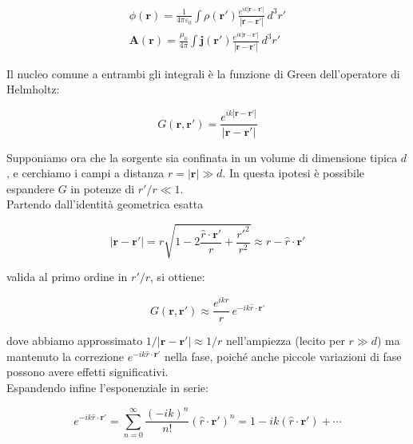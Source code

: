 \begin{tcolorbox}[colback=yellow!10!white, colframe=orange!70!black, 
boxrule=0.8pt]
\begin{align}
    \phi(\mathbf{r}) = \frac{1}{4\pi\varepsilon_0} \int 
    \rho(\mathbf{r'}) \frac{e^{ik|\mathbf{r}-\mathbf{r'}|}}
    {|\mathbf{r}-\mathbf{r'}|} \, d^3r' \\[6pt]
    \mathbf{A}(\mathbf{r}) = \frac{\mu_0}{4\pi} \int 
    \mathbf{j}(\mathbf{r'}) \frac{e^{ik|\mathbf{r}-\mathbf{r'}|}}
    {|\mathbf{r}-\mathbf{r'}|} \, d^3r'
\end{align}
\end{tcolorbox}

Il nucleo comune a entrambi gli integrali è la funzione di Green dell'operatore di Helmholtz:

\begin{equation}
    G(\mathbf{r}, \mathbf{r'}) = \frac{e^{ik|\mathbf{r}-\mathbf{r'}|}}
    {|\mathbf{r}-\mathbf{r'}|}
\end{equation}

Supponiamo ora che la sorgente sia confinata in un volume di dimensione tipica $d$, e cerchiamo i campi a distanza $r = |\mathbf{r}| \gg d$. 
In questa ipotesi è possibile espandere $G$ in potenze di $r'/r \ll 1$.\\

Partendo dall'identità geometrica esatta

\begin{equation}
    |\mathbf{r} - \mathbf{r'}| = r\sqrt{1 - 2\frac{\hat{r}\cdot\mathbf{r'}}{r} 
    + \frac{r'^2}{r^2}} \approx r - \hat{r}\cdot\mathbf{r'}
\end{equation}

\newpage

valida al primo ordine in $r'/r$, si ottiene:

\begin{equation}
    G(\mathbf{r}, \mathbf{r'}) \approx \frac{e^{ikr}}{r} \, 
    e^{-ik\hat{r}\cdot\mathbf{r'}}
\end{equation}

dove abbiamo approssimato $1/|\mathbf{r}-\mathbf{r'}| \approx 1/r$ nell'ampiezza (lecito per $r \gg d$) ma mantenuto la correzione $e^{-ik\hat{r}\cdot\mathbf{r'}}$ nella fase, poiché anche piccole variazioni di fase possono avere effetti significativi.\\

Espandendo infine l'esponenziale in serie:

\begin{tcolorbox}[colback=yellow!10!white, colframe=orange!70!black, boxrule=0.8pt]
\begin{equation} \label{eq: sviluppo_multipoli_ritard}
    e^{-ik\hat{r}\cdot\mathbf{r'}} = \sum_{n=0}^{\infty} 
    \frac{(-ik)^n}{n!} (\hat{r}\cdot\mathbf{r'})^n 
    = 1 - ik(\hat{r}\cdot\mathbf{r'}) + \cdots
\end{equation}
\end{tcolorbox}

